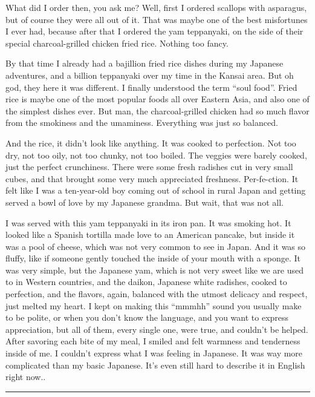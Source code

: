 \documentclass[
  letterpaper,
  oneside]{scrbook}
\begin{document}
What did I order then, you ask me? Well, first I ordered scallops with
asparagus, but of course they were all out of it. That was maybe one of
the best misfortunes I ever had, because after that I ordered the yam
teppanyaki, on the side of their special charcoal-grilled chicken fried
rice. Nothing too fancy.

By that time I already had a bajillion fried rice dishes during my
Japanese adventures, and a billion teppanyaki over my time in the Kansai
area. But oh god, they here it was different. I finally understood the
term ``soul food''. Fried rice is maybe one of the most popular foods
all over Eastern Asia, and also one of the simplest dishes ever. But
man, the charcoal-grilled chicken had so much flavor from the smokiness
and the umaminess. Everything was just so balanced.

And the rice, it didn't look like anything. It was cooked to perfection.
Not too dry, not too oily, not too chunky, not too boiled. The veggies
were barely cooked, just the perfect crunchiness. There were some fresh
radishes cut in very small cubes, and that brought some very much
appreciated freshness. Per-fe-ction. It felt like I was a ten-year-old
boy coming out of school in rural Japan and getting served a bowl of
love by my Japanese grandma. But wait, that was not all.

I was served with this yam teppanyaki in its iron pan. It was smoking
hot. It looked like a Spanish tortilla made love to an American pancake,
but inside it was a pool of cheese, which was not very common to see in
Japan. And it was so fluffy, like if someone gently touched the inside
of your mouth with a sponge. It was very simple, but the Japanese yam,
which is not very sweet like we are used to in Western countries, and
the daikon, Japanese white radishes, cooked to perfection, and the
flavors, again, balanced with the utmost delicacy and respect, just
melted my heart. I kept on making this ``mmmhh'' sound you usually make
to be polite, or when you don't know the language, and you want to
express appreciation, but all of them, every single one, were true, and
couldn't be helped. After savoring each bite of my meal, I smiled and
felt warmness and tenderness inside of me. I couldn't express what I was
feeling in Japanese. It was way more complicated than my basic Japanese.
It's even still hard to describe it in English right now..

\begin{center}\rule{0.5\linewidth}{0.5pt}\end{center}
\end{document}
